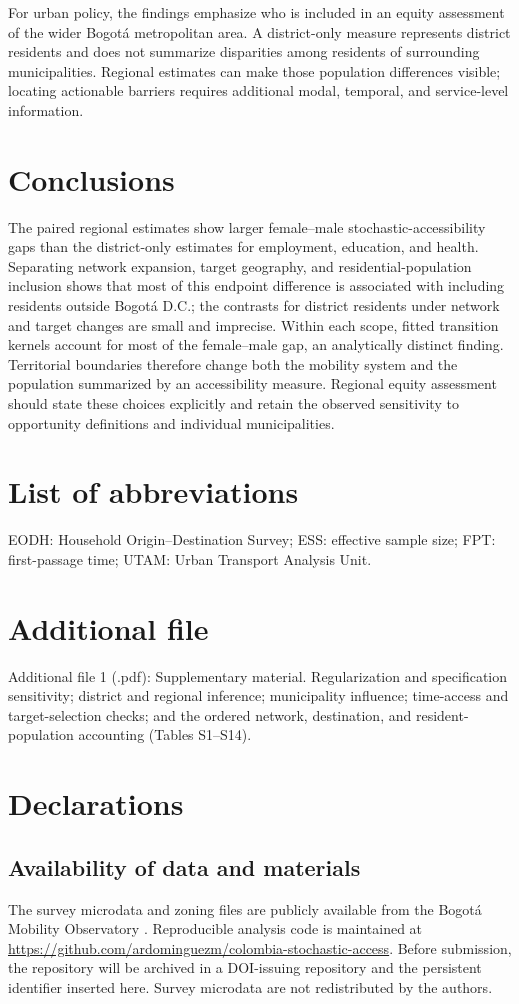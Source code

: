 \documentclass[11pt]{article}
\begin{document}
For urban policy, the findings emphasize who is included in an equity assessment of the wider Bogotá metropolitan area. A district-only measure represents district residents and does not summarize disparities among residents of surrounding municipalities. Regional estimates can make those population differences visible; locating actionable barriers requires additional modal, temporal, and service-level information.

\section{Conclusions}
The paired regional estimates show larger female--male stochastic-accessibility gaps than the district-only estimates for employment, education, and health. Separating network expansion, target geography, and residential-population inclusion shows that most of this endpoint difference is associated with including residents outside Bogotá D.C.; the contrasts for district residents under network and target changes are small and imprecise. Within each scope, fitted transition kernels account for most of the female--male gap, an analytically distinct finding. Territorial boundaries therefore change both the mobility system and the population summarized by an accessibility measure. Regional equity assessment should state these choices explicitly and retain the observed sensitivity to opportunity definitions and individual municipalities.

\section*{List of abbreviations}
EODH: Household Origin--Destination Survey; ESS: effective sample size; FPT: first-passage time; UTAM: Urban Transport Analysis Unit.

\section*{Additional file}
Additional file 1 (.pdf): Supplementary material. Regularization and specification sensitivity; district and regional inference; municipality influence; time-access and target-selection checks; and the ordered network, destination, and resident-population accounting (Tables S1--S14).

\section*{Declarations}
\subsection*{Availability of data and materials}
The survey microdata and zoning files are publicly available from the Bogotá Mobility Observatory \citep{eodh2023}. Reproducible analysis code is maintained at \url{https://github.com/ardominguezm/colombia-stochastic-access}. Before submission, the repository will be archived in a DOI-issuing repository and the persistent identifier inserted here. Survey microdata are not redistributed by the authors.
\end{document}
